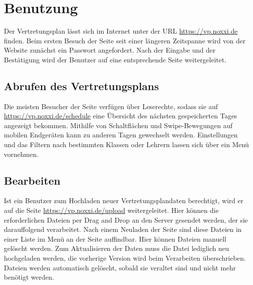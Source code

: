 \chapter{Benutzung}
Der Vertretungsplan lässt sich im Internet unter der URL \url{https://vp.noxxi.de} finden.
Beim ersten Besuch der Seite seit einer längeren Zeitspanne wird von der Website zunächst ein
Passwort angefordert. Nach der Eingabe und der Bestätigung wird der Benutzer auf eine entsprechende
Seite weitergeleitet.

\section{Abrufen des Vertretungsplans}
Die meisten Besucher der Seite verfügen über Leserechte, sodass sie auf \url{https://vp.noxxi.de/schedule}
eine Übersicht des nächsten gespeicherten Tages angezeigt bekommen. Mithilfe von Schaltflächen und
Swipe-Bewegungen auf mobilen Endgeräten kann zu anderen Tagen gewechselt werden. Einstellungen und das Filtern
nach bestimmten Klassen oder Lehrern lassen sich über ein Menü vornehmen.
\section{Bearbeiten}
Ist ein Benutzer zum Hochladen neuer Vertretungsplandaten berechtigt, wird er auf die Seite
\url{https://vp.noxxi.de/upload} weitergeleitet. Hier können die erforderlichen Dateien per Drag and Drop
an den Server gesendet werden, der sie darauffolgend verarbeitet. Nach einem Neuladen der Seite sind
diese Dateien in einer Liste im Menü an der Seite auffindbar. Hier können Dateien manuell gelöscht werden.
Zum Aktualisieren der Daten muss die Datei lediglich neu hochgeladen werden, die vorherige Version wird
beim Verarbeiten überschrieben. Dateien werden automatisch gelöscht, sobald sie veraltet sind und nicht
mehr benötigt werden.
